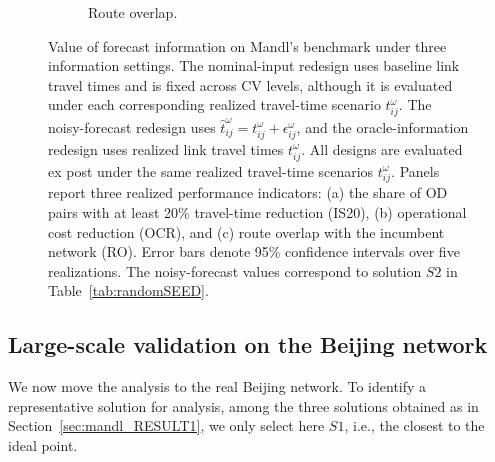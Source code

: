 \documentclass[a4paper,fleqn]{cas-sc}
\begin{document}
\begin{figure}[t]
\begin{subfigure}[t]{0.32\textwidth}
\caption{Route overlap.}
\label{fig:forecast_value_ro}
\end{subfigure}

\caption{
Value of forecast information on Mandl's benchmark under three information settings.
The nominal-input redesign uses baseline link travel times and is fixed across CV levels, although it is evaluated under each corresponding realized travel-time scenario $t_{ij}^{\omega}$.
The noisy-forecast redesign uses $\hat{t}_{ij}^{\omega}=t_{ij}^{\omega}+\epsilon_{ij}^{\omega}$, and the oracle-information redesign uses realized link travel times $t_{ij}^{\omega}$.
All designs are evaluated ex post under the same realized travel-time scenarios $t_{ij}^{\omega}$.
Panels report three realized performance indicators: (a) the share of OD pairs with at least 20\% travel-time reduction (IS20), (b) operational cost reduction (OCR), and (c) route overlap with the incumbent network (RO).
Error bars denote 95\% confidence intervals over five realizations.
The noisy-forecast values correspond to solution $S2$ in Table~\ref{tab:randomSEED}.
}
\label{fig:value_forecast_information}
\end{figure}


\subsection{Large-scale validation on the Beijing network}\label{sec:caseStudy}
We now move the analysis to the real Beijing network. To identify a representative solution for analysis, among the three solutions obtained as in Section~\ref{sec:mandl_RESULT1}, we only select here $S1$, i.e., the closest to the ideal point.
\end{document}

